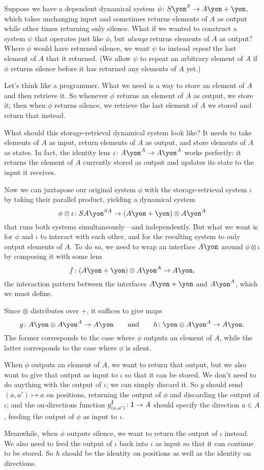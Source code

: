 \documentclass[Book-Poly]{subfiles}
\begin{document}
\begin{example}[Repeater]
Suppose we have a dependent dynamical system $\phi\colon S\yon^S\to A\yon+\yon$, which takes unchanging input and sometimes returns elements of $A$ as output while other times returning only silence.
What if we wanted to construct a system $\psi$ that operates just like $\phi$, but \emph{always} returns elements of $A$ as output?
Where $\phi$ would have returned silence, we want $\psi$ to instead \emph{repeat} the last element of $A$ that it returned. (We allow $\psi$ to repeat an arbitrary element of $A$ if $\phi$ returns silence before it has returned any elements of $A$ yet.)

Let's think like a programmer.
What we need is a way to store an element of $A$ and then retrieve it.
So whenever $\phi$ returns an element of $A$ as output, we store it; then when $\phi$ returns silence, we retrieve the last element of $A$ we stored and return that instead.

What should this storage-retrieval dynamical system look like?
It needs to take elements of $A$ as input, return elements of $A$ as output, and store elements of $A$ as states.
In fact, the identity lens $\iota\colon A\yon^A\to A\yon^A$ works perfectly: it returns the element of $A$ currently stored as output and updates its state to the input it receives.

Now we can juxtapose our original system $\phi$ with the storage-retrieval system $\iota$ by taking their parallel product, yielding a dynamical system
\[
    \phi\otimes\iota\colon SA\yon^{SA}\to (A\yon+\yon)\otimes A\yon^A
\]
that runs both systems simultaneously---and independently.
But what we want is for $\phi$ and $\iota$ to interact with each other, and for the resulting system to only output elements of $A$.
To do so, we need to wrap an interface $A\yon$ around $\phi\otimes\iota$ by composing it with some lens
\[
    f\colon(A\yon+\yon)\otimes A\yon^A\to A\yon,
\]
the interaction pattern between the interfaces $A\yon+\yon$ and $A\yon^A$, which we must define.

Since $\otimes$ distributes over $+$, it suffices to give maps
\[
    g\colon A\yon\otimes A\yon^A\to A\yon \qqand h\colon\yon\otimes A\yon^A\to A\yon.
\]
The former corresponds to the case where $\phi$ outputs an element of $A$, while the latter corresponds to the case where $\phi$ is silent.

When $\phi$ outputs an element of $A$, we want to return that output, but we also want to give that output as input to $\iota$ so that it can be stored.
We don't need to do anything with the output of $\iota$; we can simply discard it.
So $g$ should send $(a,a')\mapsto a$ on positions, returning the output of $\phi$ and discarding the output of $\iota$; and the on-directions function $g^\sharp_{(a,a')}\colon\textsf{1}\to A$ should specify the direction $a\in A$, feeding the output of $\phi$ as input to $\iota$.

Meanwhile, when $\phi$ outputs silence, we want to return the output of $\iota$ instead.
We also need to feed the output of $\iota$ back into $\iota$ as input so that it can continue to be stored.
So $h$ should be the identity on positions as well as the identity on directions.
\end{example}
\end{document}
